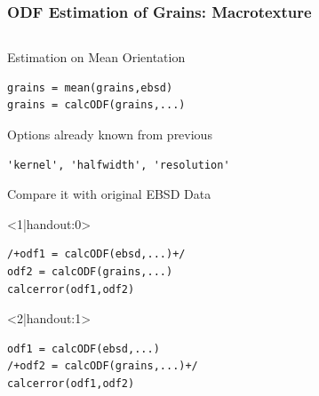 \begin{frame}[fragile]
  \frametitle{ODF Estimation of Grains: Macrotexture}


\begin{columns}[t]
\begin{column}[T]{8cm}

Estimation on Mean Orientation

\begin{lstlisting}
grains = mean(grains,ebsd)
grains = calcODF(grains,...)
\end{lstlisting}

\medskip

Options already known from previous
\begin{lstlisting}[basicstyle=\footnotesize]
'kernel', 'halfwidth', 'resolution'
\end{lstlisting}

\medskip

Compare it with original EBSD Data
\begin{onlyenv}<1|handout:0>
\begin{lstlisting}
/+odf1 = calcODF(ebsd,...)+/
odf2 = calcODF(grains,...)
calcerror(odf1,odf2)
\end{lstlisting}
\end{onlyenv}

\begin{onlyenv}<2|handout:1>
\begin{lstlisting}
odf1 = calcODF(ebsd,...)
/+odf2 = calcODF(grains,...)+/
calcerror(odf1,odf2)
\end{lstlisting}
\end{onlyenv}


\end{column}
\end{columns}
\end{frame}
